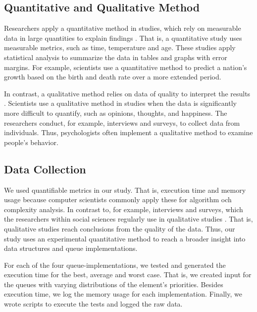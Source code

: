 \documentclass[a4paper,11pt]{kth-mag}
\newcommand*{\skippara}{\par\vspace{\baselineskip} \noindent}
\begin{document}
\subsection{Quantitative and Qualitative Method}
Researchers apply a quantitative method in studies, which rely on measurable data in large quantities to explain findings \cite{haakansson2013portal}.
That is, a quantitative study uses measurable metrics, such as time, temperature and age.
These studies apply statistical analysis to summarize the data in tables and graphs with error margins.
For example, scientists use a quantitative method to predict a nation's growth based on the birth and death rate over a more extended period.

\skippara In contrast, a qualitative method relies on data of quality to interpret the results \cite{merriam2009qualitative}.
Scientists use a qualitative method in studies when the data is significantly more difficult to quantify, such as opinions, thoughts, and happiness.
The researchers conduct, for example, interviews and surveys, to collect data from individuals.
Thus, psychologists often implement a qualitative method to examine people's behavior.

\subsection{Data Collection}
We used quantifiable metrics in our study.
That is, execution time and memory usage because computer scientists commonly apply these for algorithm och complexity analysis.
In contrast to, for example, interviews and surveys, which the researchers within social sciences regularly use in qualitative studies \cite{Omexperi69:online, haakansson2013portal}.
That is, qualitative studies reach conclusions from the quality of the data.
Thus, our study uses an experimental quantitative method to reach a broader insight into data structures and queue implementations.

\skippara For each of the four queue-implementations, we tested and generated the execution time for the best, average and worst case.
That is, we created input for the queues with varying distributions of the element's priorities.
Besides execution time, we log the memory usage for each implementation.
Finally, we wrote scripts to execute the tests and logged the raw data.
\end{document}
